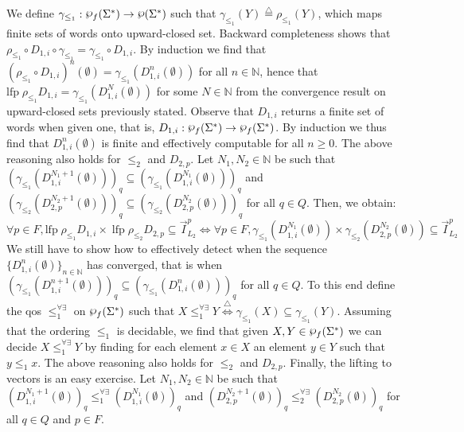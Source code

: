 We define $\gamma_{\leq_1}: \fpowerset(\Sigma^*) \rightarrow \powerset(\Sigma^*)$
such that $\gamma_{\leq_1}(Y) \overset{\triangle}{=} \rho_{\leq_1}(Y)$,
which maps finite sets of words onto upward-closed set.
Backward completeness shows that
$\rho_{\leq_1} \circ D_{1,i} \circ \gamma_{\leq_1} = \gamma_{\leq_1} \circ D_{1,i}$.
By induction we find that
$(\rho_{\leq_1} \circ D_{1,i})^n (\emptyset) = \gamma_{\leq_1}(D_{1,i}^n (\emptyset))$
for all $n \in \mathbb{N}$, hence that
$\textrm{lfp}\; \rho_{\leq_1} D_{1,i} = \gamma_{\leq_1}(D_{1,i}^N(\emptyset))$
for some $N \in \mathbb{N}$ from the convergence result on upward-closed sets
previously stated.
Observe that $D_{1,i}$ returns a finite set of words when given one,
that is, $D_{1,i}: \fpowerset(\Sigma^*) \rightarrow \fpowerset(\Sigma^*)$.
By induction we thus find that $D_{1,i}^n(\emptyset)$ is finite and effectively
computable for all $n \geq 0$.
The above reasoning also holds for $\leq_2$ and $D_{2,p}$.
Let $N_1,N_2 \in \mathbb{N}$ be such that
$(\gamma_{\leq_1}(D_{1,i}^{N_1+1}(\emptyset)))_q \subseteq
(\gamma_{\leq_1}(D_{1,i}^{N_1}(\emptyset)))_q$
and
$(\gamma_{\leq_2}(D_{2,p}^{N_2+1}(\emptyset)))_q \subseteq
(\gamma_{\leq_2}(D_{2,p}^{N_2}(\emptyset)))_q$
for all $q \in Q$.
Then, we obtain:
\[ \forall p \in F, \textrm{lfp} \; \rho_{\leq_1} D_{1,i}
\times \; \textrm{lfp} \; \rho_{\leq_2}  D_{2,p} \subseteq \vec{I}_{L_2}^p
\Longleftrightarrow
\forall p \in F, \gamma_{\leq_1}(D_{1,i}^{N_1}(\emptyset)) \times
\gamma_{\leq_2}(D_{2,p}^{N_2}(\emptyset)) \subseteq \vec{I}_{L_2}^p \]
We still have to show how to effectively detect when the sequence
$\{D_{1,i}^n(\emptyset)\}_{n \in \mathbb{N}}$ has converged, that is when
$(\gamma_{\leq_1}(D_{1,i}^{n+1}(\emptyset)))_q \subseteq
(\gamma_{\leq_1}(D_{1,i}^{n}(\emptyset)))_q$ for all $q \in Q$.
To this end define the qos $\leq_1^{\forall \exists}$ on $\fpowerset(\Sigma^*)$
such that $X \leq_1^{\forall \exists} Y \overset{\triangle}{\Longleftrightarrow}
\gamma_{\leq_1}(X) \subseteq \gamma_{\leq_1}(Y)$.
Assuming that the ordering $\leq_1$ is decidable, we find that given
$X,Y \in \fpowerset(\Sigma^*)$ we can decide $X \leq_1^{\forall \exists} Y$
by finding for each element $x \in X$ an element $y \in Y$ such that $y \leq_1 x$.
The above reasoning also holds for $\leq_2$ and $D_{2,p}$.
Finally, the lifting to vectors is an easy exercise.
Let $N_1,N_2 \in \mathbb{N}$ be such that
$(D_{1,i}^{N_1+1}(\emptyset))_q \leq_1^{\forall \exists} (D_{1,i}^{N_1}(\emptyset))_q$
and
$(D_{2,p}^{N_2+1}(\emptyset))_q \leq_2^{\forall \exists} (D_{2,p}^{N_2}(\emptyset))_q$
for all $q \in Q$ and $p \in F$.

